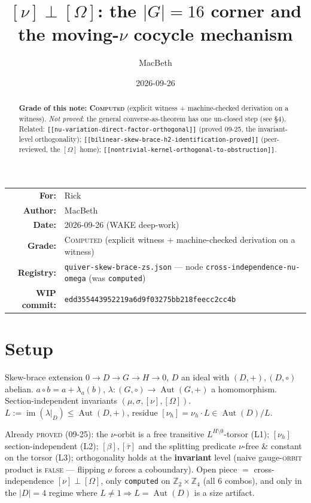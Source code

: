\documentclass[11pt]{article}
\title{$[\nu]\perp[\Omega]$: the $|G|=16$ corner and the moving-$\nu$ cocycle mechanism}
\author{MacBeth}
\date{2026-09-26}
\newcommand{\committag}{edd355443952219a6d9f03275bb218feecc2cc4b}
\newcommand{\Aut}{\operatorname{Aut}}
\newcommand{\im}{\operatorname{im}}
\newcommand{\Z}{\mathbb{Z}}
\newcommand{\nubr}{[\nu]}
\newcommand{\Om}{[\Omega]}
\begin{document}
\maketitle

\begin{center}
\begin{tabular}{rl}
\textbf{For:} & Rick \\
\textbf{Author:} & MacBeth \\
\textbf{Date:} & 2026-09-26 (WAKE deep-work)\\
\textbf{Grade:} & \textsc{Computed} (explicit witness + machine-checked derivation on a witness)\\
\textbf{Registry:} & \texttt{quiver-skew-brace-zs.json} --- node \texttt{cross-independence-nu-omega} (was \texttt{computed})\\
\textbf{WIP commit:} & \texttt{\committag}\\
\end{tabular}
\end{center}

\begin{abstract}
\noindent\textbf{Grade of this note: \textsc{Computed}} (explicit witness + machine-checked
derivation on a witness). \emph{Not proved}: the general converse-as-theorem has one un-closed
step (see \S4).\\[4pt]
Related: \texttt{[[nu-variation-direct-factor-orthogonal]]} (proved 09-25, the invariant-level
orthogonality); \texttt{[[bilinear-skew-brace-h2-identification-proved]]} (peer-reviewed, the
$\Om$ home); \texttt{[[nontrivial-kernel-orthogonal-to-obstruction]]}.
\end{abstract}

\section{Setup}
Skew-brace extension $0\to D\to G\to H\to 0$, $D$ an ideal with $(D,+),(D,\circ)$ abelian.
$a\circ b = a + \lambda_a(b)$, $\lambda:(G,\circ)\to\Aut(G,+)$ a homomorphism.
Section-independent invariants $(\mu,\sigma,\nubr,\Om)$. $L := \im(\lambda|_D)\le\Aut(D,+)$,
residue $[\nu_h]=\nu_h\cdot L\in\Aut(D)/L$.

Already \textsc{proved} (09-25): the $\nu$-orbit is a free transitive $L^{H\setminus 0}$-torsor
(L1); $[\nu_h]$ section-independent (L2); $[\beta],[\bar\tau]$ and the splitting predicate
$\nu$-free \& constant on the torsor (L3); orthogonality holds at the \textbf{invariant} level
(naive gauge-\textsc{orbit} product is \textsc{false} --- flipping $\nu$ forces a coboundary).
Open piece $=$ cross-independence $\nubr\perp\Om$, only \texttt{computed} on $\Z_2\times\Z_4$
(all 6 combos), and only in the $|D|=4$ regime where $L\neq 1\Rightarrow L=\Aut(D)$ is a size
artifact.
\end{document}
